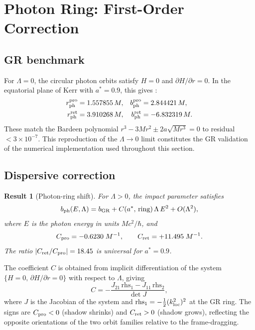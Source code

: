 \documentclass[12pt,a4paper]{article}
\newtheorem{result}{Result}
\newcommand{\bph}{b_{\rm ph}}
\begin{document}
\section{Photon Ring: First-Order Correction}
\label{sec:photon_ring}

\subsection{GR benchmark}

For $\Lambda=0$, the circular photon orbits satisfy $H=0$ and
$\partial H/\partial r=0$.
In the equatorial plane of Kerr with $a^*=0.9$, this gives
\citep{Bardeen1973}:
\begin{align}
  r_{\rm ph}^{\rm pro} &= 1.557855\,M, &
  b_{\rm ph}^{\rm pro} &= 2.844421\,M, \\
  r_{\rm ph}^{\rm ret} &= 3.910268\,M, &
  b_{\rm ph}^{\rm ret} &= -6.832319\,M.
\end{align}
These match the Bardeen polynomial $r^3-3Mr^2\pm 2a\sqrt{Mr^3}=0$
to residual $<3\times10^{-7}$. This reproduction of the $\Lambda\to0$
limit constitutes the GR validation of the numerical implementation
used throughout this section.

\subsection{Dispersive correction}

\begin{result}[Photon-ring shift]
\label{res:pring}
For $\Lambda>0$, the impact parameter satisfies
\begin{equation}\label{eq:db}
  \bph(E,\Lambda) = b_{\rm GR} + C(a^*,\,{\rm ring})\,\Lambda\,E^2
  + O(\Lambda^2),
\end{equation}
where $E$ is the photon energy in units $Mc^2/\hbar$, and
\begin{equation}
  C_{\rm pro} = -0.6230\;M^{-1},\qquad
  C_{\rm ret} = +11.495\;M^{-1}.
\end{equation}
The ratio $|C_{\rm ret}/C_{\rm pro}| = 18.45$ is universal for $a^*=0.9$.
\end{result}

The coefficient $C$ is obtained from implicit differentiation of the system
$\{H=0,\,\partial H/\partial r=0\}$ with respect to $\Lambda$, giving
\begin{equation}\label{eq:C_jacobian}
  C = -\frac{J_{21}\,\mathrm{rhs}_1 - J_{11}\,\mathrm{rhs}_2}{\det J},
\end{equation}
where $J$ is the Jacobian of the system and
$\mathrm{rhs}_1 = -\tfrac{1}{2}(k_{\rm loc}^2)^2$ at the GR ring.
The signs are $C_{\rm pro}<0$ (shadow shrinks) and $C_{\rm ret}>0$
(shadow grows), reflecting the opposite orientations of the two orbit families
relative to the frame-dragging.
\end{document}
